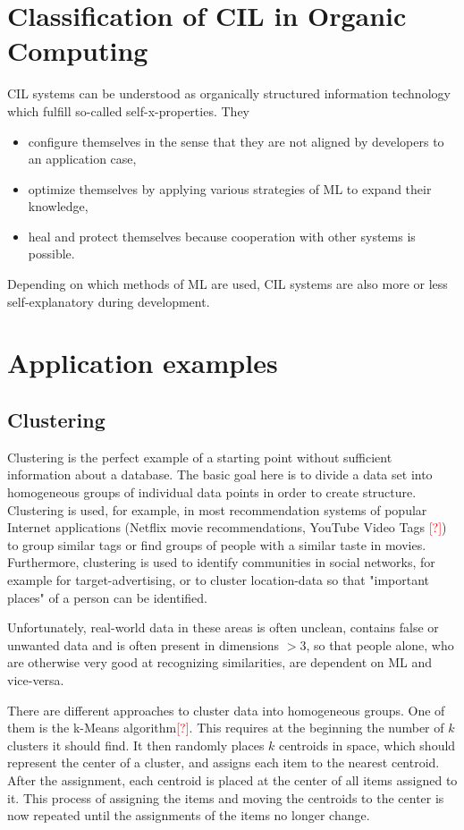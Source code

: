 \documentclass[conference,compsoc]{IEEEtran}
\newcommand\notes[1]{\textcolor{red}{#1}}
\begin{document}
\section{Classification of CIL in Organic Computing}
CIL systems can be understood as organically structured information technology
which fulfill so-called self-x-properties\cite{Organic:schloer}\cite{Organic:schmeckt}.
They
\begin{itemize}
    \item configure themselves in the sense that they are not aligned by developers to an application case,
    \item optimize themselves by applying various strategies of ML to expand their knowledge,
    \item heal and protect themselves because cooperation with other systems is possible.
\end{itemize}
Depending on which methods of ML are used, CIL systems are also more or less self-explanatory 
during development\cite{Organic:schloer}.

\section{Application examples}
\subsection{Clustering}
Clustering is the perfect example of a starting point without sufficient information about a database. 
The basic goal here is to divide a data set into homogeneous groups of individual data points in order to create structure.
Clustering is used, for example, in most recommendation systems of popular Internet applications (Netflix movie recommendations, YouTube Video Tags \notes{[?]}) to group similar tags or find groups of people with a similar taste in movies.
Furthermore, clustering is used to identify communities in social networks, for example for target-advertising, or to cluster location-data so that "important places" of a person can be identified.

Unfortunately, real-world data in these areas is often unclean, contains false or unwanted data and is often present in 
dimensions $>$3, so that people alone, who are otherwise very good at recognizing similarities, are dependent on ML and vice-versa.

There are different approaches to cluster data into homogeneous groups. One of them is the k-Means algorithm\notes{[?]}. This requires at the beginning the number of $k$ clusters it should find. It then randomly places $k$ centroids in space, which should represent the center of a cluster, and assigns each item to the nearest centroid. After the assignment, each centroid is placed at the center of all items assigned to it. This process of assigning the items and moving the centroids to
the center is now repeated until the assignments of the items no longer change.
\end{document}
